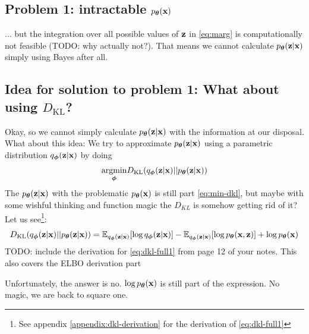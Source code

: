 \documentclass[11pt]{article}
\theoremstyle{definition}
\begin{document}
\subsection{Problem 1: intractable  $p_{\boldsymbol{\theta}}(\mathbf{x})$}
... but the integration over all possible values of $\mathbf{z}$ in \autoref{eq:marg} is computationally not feasible (TODO: why actually not?). That means we cannot calculate $p_{\boldsymbol{\theta}}(\mathbf{z}|\mathbf{x})$ simply using Bayes after all.

\subsection{Idea for solution to problem 1: What about using $D_{\text{KL}}$?}
Okay, so we cannot simply calculate $p_{\boldsymbol{\theta}}(\mathbf{z}|\mathbf{x})$ with the information at our disposal. What about this idea: We try to approximate $p_{\boldsymbol{\theta}}(\mathbf{z}|\mathbf{x})$ using a parametric distribution $q_{\boldsymbol{\phi}}(\mathbf{z}|\mathbf{x})$ by doing
\begin{equation}
	\underset{\boldsymbol{\phi}}{\mathrm{argmin}} D_{\text{KL}}(q_{\boldsymbol{\phi}}(\mathbf{z}|\mathbf{x})||p_{\boldsymbol{\theta}}(\mathbf{z}|\mathbf{x}))
	\label{eq:min-dkl}
\end{equation}
The $p_{\boldsymbol{\theta}}(\mathbf{z}|\mathbf{x})$ with the problematic $p_{\boldsymbol{\theta}}(\mathbf{x})$ is still part \autoref{eq:min-dkl}, but maybe with some wishful thinking and function magic the $D_{KL}$ is somehow getting rid of it? Let us see\footnote{See appendix \autoref{appendix:dkl-derivation} for the derivation of \autoref{eq:dkl-full1}}:
\begin{equation}
	D_{\text{KL}}(q_{\boldsymbol{\phi}}(\mathbf{z}|\mathbf{x})||p_{\boldsymbol{\theta}}(\mathbf{z}|\mathbf{x})) = \mathbb{E}_{q_{\boldsymbol{\phi}}(\mathbf{z}|\mathbf{x})}[\log q_{\boldsymbol{\phi}}(\mathbf{z}|\mathbf{x})] - \mathbb{E}_{q_{\boldsymbol{\phi}}(\mathbf{z}|\mathbf{x})}[\log p_{\boldsymbol{\theta}}(\mathbf{x},\mathbf{z})] + \log p_{\boldsymbol{\theta}}(\mathbf{x})
	\label{eq:dkl-full1}
\end{equation}
TODO: include the derivation for \autoref{eq:dkl-full1} from page 12 of your notes. This also covers the ELBO derivation part  \par
Unfortunately, the answer is no. $\log p_{\boldsymbol{\theta}}(\mathbf{x})$ is still part of the expression. No magic, we are back to square one.
\end{document}
